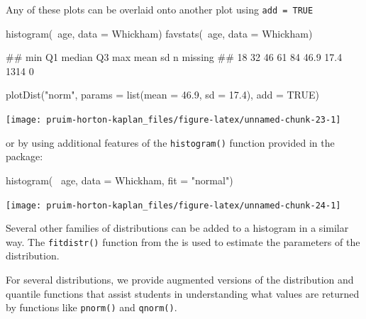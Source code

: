 \noindent
Any of these plots can be overlaid onto another plot using
\texttt{add\ =\ TRUE}

\begin{Schunk}
\begin{Sinput}
histogram(~age, data = Whickham)
favstats(~age, data = Whickham)
\end{Sinput}
\begin{Soutput}
##  min Q1 median Q3 max mean   sd    n missing
##   18 32     46 61  84 46.9 17.4 1314       0
\end{Soutput}
\begin{Sinput}
plotDist("norm", params = list(mean = 46.9, sd = 17.4), add = TRUE)
\end{Sinput}


\begin{center}\texttt{[image: pruim-horton-kaplan\_files/figure-latex/unnamed-chunk-23-1]} \end{center}

\end{Schunk}

or by using additional features of the \texttt{histogram()} function
provided in the  package:

\begin{Schunk}
\begin{Sinput}
histogram( ~age, data = Whickham, fit = "normal")
\end{Sinput}


\begin{center}\texttt{[image: pruim-horton-kaplan\_files/figure-latex/unnamed-chunk-24-1]} \end{center}

\end{Schunk}

\noindent Several other families of distributions can be added to a
histogram in a similar way. The \texttt{fitdistr()} function from the
 \citep{MASS} is used to estimate the parameters of the
distribution.

For several distributions, we provide augmented versions of the
distribution and quantile functions that assist students in
understanding what values are returned by functions like
\texttt{pnorm()} and \texttt{qnorm()}.

